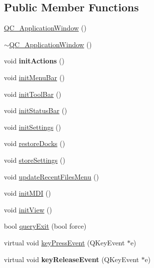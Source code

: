 \subsection*{Public Member Functions}
\begin{DoxyCompactItemize}
\item 
\hyperlink{classQC__ApplicationWindow_a0a23721ba373203ff848f58e8b5be012}{Q\-C\-\_\-\-Application\-Window} ()
\item 
\hyperlink{classQC__ApplicationWindow_ad38a31b69c0fbb030bd0180218e1be44}{$\sim$\-Q\-C\-\_\-\-Application\-Window} ()
\item 
\hypertarget{classQC__ApplicationWindow_ad16be71ba159192a5e0069280d301591}{void {\bfseries init\-Actions} ()}\label{classQC__ApplicationWindow_ad16be71ba159192a5e0069280d301591}

\item 
void \hyperlink{classQC__ApplicationWindow_ab81d96d9d5277f78dcd5a74f2b47fb22}{init\-Menu\-Bar} ()
\item 
void \hyperlink{classQC__ApplicationWindow_a289150d6475e4c1443c8a241fcc2218a}{init\-Tool\-Bar} ()
\item 
void \hyperlink{classQC__ApplicationWindow_ad4416a6e8de27f55342ee575411d9672}{init\-Status\-Bar} ()
\item 
void \hyperlink{classQC__ApplicationWindow_a935141b67d3ecd5a64968a46e73bbe69}{init\-Settings} ()
\item 
void \hyperlink{classQC__ApplicationWindow_a008339a5a16725137fd2871f3ed04432}{restore\-Docks} ()
\item 
void \hyperlink{classQC__ApplicationWindow_a42586f9c672ef225cd26e4ea63798ea2}{store\-Settings} ()
\item 
void \hyperlink{classQC__ApplicationWindow_a40e5133c6fcb636b09c53dc371589787}{update\-Recent\-Files\-Menu} ()
\item 
void \hyperlink{classQC__ApplicationWindow_a11919c2510c104447dc5d118f8db64b5}{init\-M\-D\-I} ()
\item 
void \hyperlink{classQC__ApplicationWindow_a7073f4bb80cbee73dcfdfdf52bdc9930}{init\-View} ()
\item 
bool \hyperlink{classQC__ApplicationWindow_ab6d89bc7e787e856f836c8817b10d7b0}{query\-Exit} (bool force)
\item 
virtual void \hyperlink{classQC__ApplicationWindow_aa8644fdf96633e6a116f41988a4d703f}{key\-Press\-Event} (Q\-Key\-Event $\ast$e)
\item 
\hypertarget{classQC__ApplicationWindow_add02efa9f60d478c7951404b8806d3c5}{virtual void {\bfseries key\-Release\-Event} (Q\-Key\-Event $\ast$e)}\label{classQC__ApplicationWindow_add02efa9f60d478c7951404b8806d3c5}


\end{DoxyCompactItemize}
